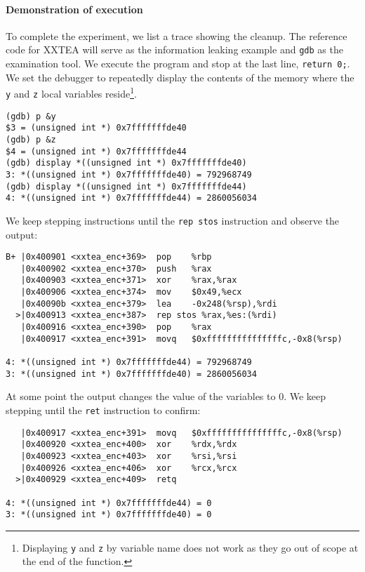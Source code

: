 \documentclass[a4paper,10pt,openright]{memoir}
\newcommand{\code}[1]{\texttt{#1}}
\begin{document}
\paragraph{Demonstration of execution}

To complete the experiment, we list a trace showing the cleanup. The 
reference code for XXTEA will serve as the information leaking example 
and \code{gdb} as the examination tool. We execute the program and stop 
at the last line, \code{return 0;}. We set the debugger to repeatedly 
display the contents of the memory where the \code{y} and \code{z} 
local variables reside\footnote{Displaying \code{y} and \code{z} by 
variable name does not work as they go out of scope at the end of the 
function.}.

\begin{verbatim}
(gdb) p &y
$3 = (unsigned int *) 0x7fffffffde40
(gdb) p &z
$4 = (unsigned int *) 0x7fffffffde44
(gdb) display *((unsigned int *) 0x7fffffffde40)
3: *((unsigned int *) 0x7fffffffde40) = 792968749
(gdb) display *((unsigned int *) 0x7fffffffde44)
4: *((unsigned int *) 0x7fffffffde44) = 2860056034
\end{verbatim}

We keep stepping instructions until the \code{rep stos} instruction and 
observe the output:

\begin{verbatim}
B+ |0x400901 <xxtea_enc+369>  pop    %rbp                          
   |0x400902 <xxtea_enc+370>  push   %rax                          
   |0x400903 <xxtea_enc+371>  xor    %rax,%rax                     
   |0x400906 <xxtea_enc+374>  mov    $0x49,%ecx                    
   |0x40090b <xxtea_enc+379>  lea    -0x248(%rsp),%rdi             
  >|0x400913 <xxtea_enc+387>  rep stos %rax,%es:(%rdi)             
   |0x400916 <xxtea_enc+390>  pop    %rax                          
   |0x400917 <xxtea_enc+391>  movq   $0xfffffffffffffffc,-0x8(%rsp)

4: *((unsigned int *) 0x7fffffffde44) = 792968749
3: *((unsigned int *) 0x7fffffffde40) = 2860056034
\end{verbatim}

At some point the output changes the value of the variables to 0. We 
keep stepping until the \code{ret} instruction to confirm:

\begin{verbatim}
   |0x400917 <xxtea_enc+391>  movq   $0xfffffffffffffffc,-0x8(%rsp)
   |0x400920 <xxtea_enc+400>  xor    %rdx,%rdx                     
   |0x400923 <xxtea_enc+403>  xor    %rsi,%rsi                     
   |0x400926 <xxtea_enc+406>  xor    %rcx,%rcx                     
  >|0x400929 <xxtea_enc+409>  retq 

4: *((unsigned int *) 0x7fffffffde44) = 0
3: *((unsigned int *) 0x7fffffffde40) = 0
\end{verbatim}
\end{document}

